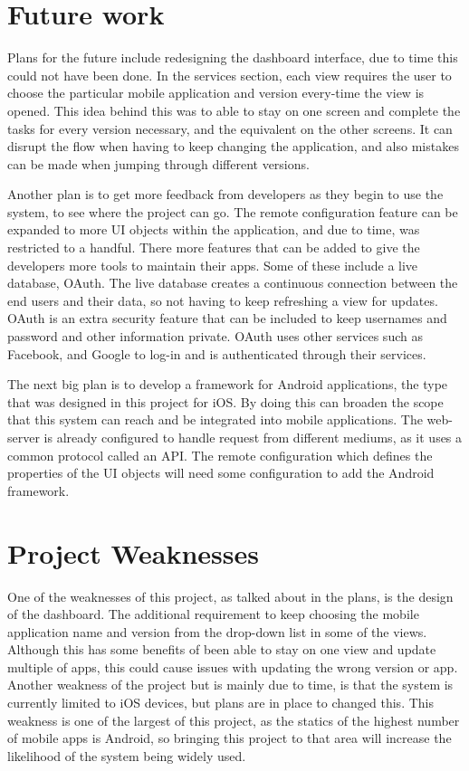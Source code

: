 \section{Future work}

Plans for the future include redesigning the dashboard interface, due to time this could not have been done. In the services section, each view requires the user to choose the particular mobile application and version every-time the view is opened. This idea behind this was to able to stay on one screen and complete the tasks for every version necessary, and the equivalent on the other screens. It can disrupt the flow when having to keep changing the application, and also mistakes can be made when jumping through different versions.

Another plan is to get more feedback from developers as they begin to use the system, to see where the project can go. The remote configuration feature can be expanded to more UI objects within the application, and due to time, was restricted to a handful. There more features that can be added to give the developers more tools to maintain their apps. Some of these include a live database, OAuth. The live database creates a continuous connection between the end users and their data, so not having to keep refreshing a view for updates. OAuth is an extra security feature that can be included to keep usernames and password and other information private. OAuth uses other services such as Facebook, and Google to log-in and is authenticated through their services.


The next big plan is to develop a framework for Android applications, the type that was designed in this project for iOS. By doing this can broaden the scope that this system can reach and be integrated into mobile applications. The web-server is already configured to handle request from different mediums, as it uses a common protocol called an API. The remote configuration which defines the properties of the UI objects will need some configuration to add the Android framework.

\section{Project Weaknesses}

One of the weaknesses of this project, as talked about in the plans, is the design of the dashboard. The additional requirement to keep choosing the mobile application name and version from the drop-down list in some of the views. Although this has some benefits of been able to stay on one view and update multiple of apps, this could cause issues with updating the wrong version or app. Another weakness of the project but is mainly due to time, is that the system is currently limited to iOS devices, but plans are in place to changed this. This weakness is one of the largest of this project, as the statics of the highest number of mobile apps is Android, so bringing this project to that area will increase the likelihood of the system being widely used.

